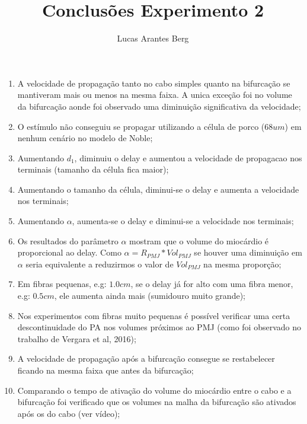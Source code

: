 \documentclass[]{article}
\title{Conclusões Experimento 2}
\author{Lucas Arantes Berg}
\begin{document}
	
	\maketitle
	
	\begin{enumerate}
		
		\item A velocidade de propagação tanto no cabo simples quanto na bifurcação se mantiveram mais ou menos na mesma faixa. A unica exceção foi no volume da bifurcação aonde foi observado uma diminuição significativa da velocidade;
		
		\item O estímulo não conseguiu se propagar utilizando a célula de porco ($68 um$) em nenhum cenário no modelo de Noble;
		
		\item Aumentando $d_1$, diminuiu o delay e aumentou a velocidade de propagacao nos terminais (tamanho da célula fica maior);
		
		\item  Aumentando o tamanho da célula, diminui-se o delay e aumenta a velocidade nos terminais;
		
		\item Aumentando $\alpha$, aumenta-se o delay e diminui-se a velocidade nos terminais;
		
		\item Os resultados do parâmetro $\alpha$ mostram que o volume do miocárdio é proporcional ao delay. Como $\alpha = R_{PMJ}*Vol_{PMJ}$ se houver uma diminuição em $\alpha$ seria equivalente a reduzirmos o valor de $Vol_{PMJ}$ na mesma proporção;
		
		\item Em fibras pequenas, e.g: $1.0 cm$, se o delay já for alto com uma fibra menor, e.g: $0.5 cm$, ele aumenta ainda mais (sumidouro muito grande);
		
		\item Nos experimentos com fibras muito pequenas é possível verificar uma certa descontinuidade do PA nos volumes próximos ao PMJ (como foi observado no trabalho de Vergara et al, 2016);
		
		\item A velocidade de propagação após a bifurcação consegue se restabelecer ficando na mesma faixa que antes da bifurcação;
		
		\item Comparando o tempo de ativação do volume do miocárdio entre o cabo e a bifurcação foi verificado que os volumes na malha da bifurcação são ativados após os do cabo (ver vídeo);
		

\end{enumerate}
\end{document}
